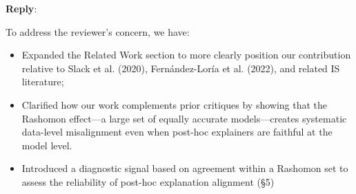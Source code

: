 \documentclass[11pt]{article}
\newcounter{se}[section]
\newcounter{reviewer}
\newenvironment{reply}
 {\par\medskip \noindent \begin{sf}\textbf{Reply}:\ }
 {\medskip \end{sf}}
\begin{document}
\begin{reply}

To address the reviewer's concern, we have:
\begin{itemize}
\item Expanded the Related Work section to more clearly position our contribution relative to Slack et al. (2020), Fernández-Loría et al. (2022), and related IS literature;
\item Clarified how our work complements prior critiques by showing that the Rashomon effect—a large set of equally accurate models—creates systematic data-level misalignment even when post-hoc explainers are faithful at the model level.
\item Introduced a diagnostic signal based on agreement within a Rashomon set to assess the reliability of post-hoc explanation alignment (\S 5)
\end{itemize}

\end{reply}
\end{document}
